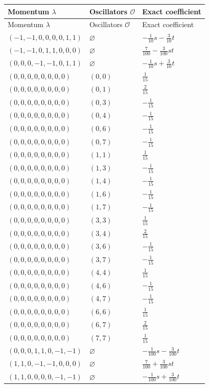 \begingroup\scriptsize
\setlength{\tabcolsep}{5pt}
\begin{longtable}{@{}lll@{}}
\toprule
Momentum $\lambda$ & Oscillators $\mathcal O$ & Exact coefficient\\
\midrule\endfirsthead
\toprule
Momentum $\lambda$ & Oscillators $\mathcal O$ & Exact coefficient\\
\midrule\endhead
\bottomrule\endfoot
$(-1,-1,0,0,0,0,1,1)$ & $\varnothing$ & $-\frac{1}{10}s-\frac{3}{10}t$\\
$(-1,-1,0,1,1,0,0,0)$ & $\varnothing$ & $\frac{7}{100}-\frac{3}{100}st$\\
$(0,0,0,-1,-1,0,1,1)$ & $\varnothing$ & $-\frac{1}{10}s+\frac{3}{10}t$\\
$(0,0,0,0,0,0,0,0)$ & $(0,0)$ & $\frac{1}{15}$\\
$(0,0,0,0,0,0,0,0)$ & $(0,1)$ & $\frac{2}{15}$\\
$(0,0,0,0,0,0,0,0)$ & $(0,3)$ & $-\frac{1}{15}$\\
$(0,0,0,0,0,0,0,0)$ & $(0,4)$ & $-\frac{1}{15}$\\
$(0,0,0,0,0,0,0,0)$ & $(0,6)$ & $-\frac{1}{15}$\\
$(0,0,0,0,0,0,0,0)$ & $(0,7)$ & $-\frac{1}{15}$\\
$(0,0,0,0,0,0,0,0)$ & $(1,1)$ & $\frac{1}{15}$\\
$(0,0,0,0,0,0,0,0)$ & $(1,3)$ & $-\frac{1}{15}$\\
$(0,0,0,0,0,0,0,0)$ & $(1,4)$ & $-\frac{1}{15}$\\
$(0,0,0,0,0,0,0,0)$ & $(1,6)$ & $-\frac{1}{15}$\\
$(0,0,0,0,0,0,0,0)$ & $(1,7)$ & $-\frac{1}{15}$\\
$(0,0,0,0,0,0,0,0)$ & $(3,3)$ & $\frac{1}{15}$\\
$(0,0,0,0,0,0,0,0)$ & $(3,4)$ & $\frac{2}{15}$\\
$(0,0,0,0,0,0,0,0)$ & $(3,6)$ & $-\frac{1}{15}$\\
$(0,0,0,0,0,0,0,0)$ & $(3,7)$ & $-\frac{1}{15}$\\
$(0,0,0,0,0,0,0,0)$ & $(4,4)$ & $\frac{1}{15}$\\
$(0,0,0,0,0,0,0,0)$ & $(4,6)$ & $-\frac{1}{15}$\\
$(0,0,0,0,0,0,0,0)$ & $(4,7)$ & $-\frac{1}{15}$\\
$(0,0,0,0,0,0,0,0)$ & $(6,6)$ & $\frac{1}{15}$\\
$(0,0,0,0,0,0,0,0)$ & $(6,7)$ & $\frac{2}{15}$\\
$(0,0,0,0,0,0,0,0)$ & $(7,7)$ & $\frac{1}{15}$\\
$(0,0,0,1,1,0,-1,-1)$ & $\varnothing$ & $-\frac{1}{100}s-\frac{3}{100}t$\\
$(1,1,0,-1,-1,0,0,0)$ & $\varnothing$ & $\frac{7}{100}+\frac{3}{100}st$\\
$(1,1,0,0,0,0,-1,-1)$ & $\varnothing$ & $-\frac{1}{100}s+\frac{3}{100}t$\\
\end{longtable}
\endgroup

